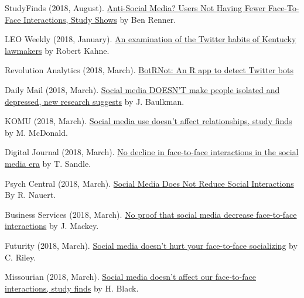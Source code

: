 \begin{bibenum}
    \item[] StudyFinds (2018, August).
      \href{https://www.studyfinds.org/social-media-not-decrease-face-face-interaction-study-says/}{Anti-Social Media? Users Not Having Fewer Face-To-Face Interactions, Study Shows} by Ben Renner.
    \item[] LEO Weekly (2018, January).
      \href{https://www.leoweekly.com/2018/01/kentucky-legislature-twitter-analysis/}{An examination of the Twitter habits of Kentucky lawmakers} by Robert Kahne.
    \item[] Revolution Analytics (2018, March).
      \href{http://blog.revolutionanalytics.com/2018/03/twitter-bot-or-not.html}{BotRNot: An R app to detect Twitter bots}
    \item[] Daily Mail (2018, March).
      \href{http://www.dailymail.co.uk/health/article-5455279/Facebook-does-NOT-decrease-social-interaction.html}{Social media DOESN'T make people isolated and depressed, new research suggests} by J. Baulkman.
    \item[] KOMU (2018, March).
      \href{http://www.komu.com/news/social-media-use-doesn-t-affect-relationships-study-finds}{Social media use doesn't affect relationships, study finds} by M. McDonald.
    \item[] Digital Journal (2018, March).
      \href{http://www.digitaljournal.com/tech-and-science/technology/no-decline-in-face-to-face-interactions-in-the-social-media-era/article/516359}{No decline in face-to-face interactions in the social media era} by T. Sandle.
    \item[] Psych Central (2018, March).
      \href{https://psychcentral.com/news/2018/03/02/social-media-does-not-reduce-social-interactions/133209.html}{Social Media Does Not Reduce Social Interactions} By R. Nauert.
    \item[] Business Services (2018, March).
      \href{http://businessservices24.com/44/no-proof-that-social-media-decrease-face-to-face-interactions/}{No proof that social media decrease face-to-face interactions} by J. Mackey.
    \item[] Futurity (2018, March).
      \href{http://www.futurity.org/social-media-social-interactions-1692872/}{Social media doesn’t hurt your face-to-face socializing} by C. Riley.
    \item[] Missourian (2018, March).
      \href{https://www.columbiamissourian.com/news/higher_education/social-media-doesn-t-affect-our-face-to-face-interactions/}{Social media doesn't affect our face-to-face interactions, study finds} by H. Black.

\end{bibenum}
